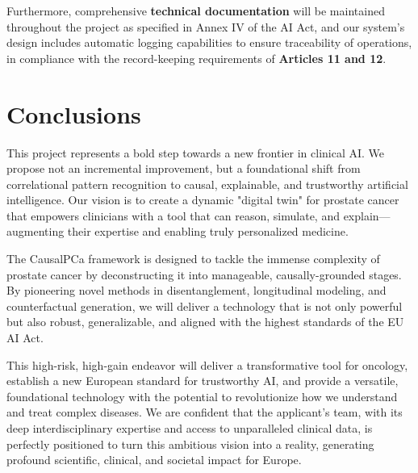 \documentclass[11pt, a4paper]{article}
\begin{document}
Furthermore, comprehensive \textbf{technical documentation} will be maintained throughout the project as specified in Annex IV of the AI Act, and our system's design includes automatic logging capabilities to ensure traceability of operations, in compliance with the record-keeping requirements of \textbf{Articles 11 and 12}.



\section{Conclusions}
This project represents a bold step towards a new frontier in clinical AI. We propose not an incremental improvement, but a foundational shift from correlational pattern recognition to causal, explainable, and trustworthy artificial intelligence. Our vision is to create a dynamic "digital twin" for prostate cancer that empowers clinicians with a tool that can reason, simulate, and explain—augmenting their expertise and enabling truly personalized medicine.

The CausalPCa framework is designed to tackle the immense complexity of prostate cancer by deconstructing it into manageable, causally-grounded stages. By pioneering novel methods in disentanglement, longitudinal modeling, and counterfactual generation, we will deliver a technology that is not only powerful but also robust, generalizable, and aligned with the highest standards of the EU AI Act.

This high-risk, high-gain endeavor will deliver a transformative tool for oncology, establish a new European standard for trustworthy AI, and provide a versatile, foundational technology with the potential to revolutionize how we understand and treat complex diseases. We are confident that the applicant's team, with its deep interdisciplinary expertise and access to unparalleled clinical data, is perfectly positioned to turn this ambitious vision into a reality, generating profound scientific, clinical, and societal impact for Europe.



\end{document}

